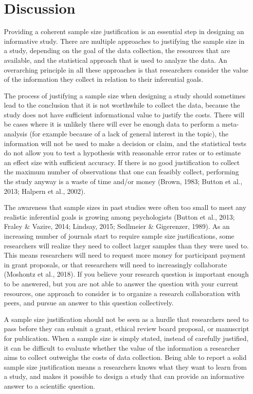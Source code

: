 \documentclass[
  english,
  ,jou, a4paper,floatsintext]{apa6}
\begin{document}
\hypertarget{discussion}{%
\section{Discussion}\label{discussion}}

Providing a coherent sample size justification is an essential step in designing an informative study. There are multiple approaches to justifying the sample size in a study, depending on the goal of the data collection, the resources that are available, and the statistical approach that is used to analyze the data. An overarching principle in all these approaches is that researchers consider the value of the information they collect in relation to their inferential goals.

The process of justifying a sample size when designing a study should sometimes lead to the conclusion that it is not worthwhile to collect the data, because the study does not have sufficient informational value to justify the costs. There will be cases where it is unlikely there will ever be enough data to perform a meta-analysis (for example because of a lack of general interest in the topic), the information will not be used to make a decision or claim, and the statistical tests do not allow you to test a hypothesis with reasonable error rates or to estimate an effect size with sufficient accuracy. If there is no good justification to collect the maximum number of observations that one can feasibly collect, performing the study anyway is a waste of time and/or money (Brown, 1983; Button et al., 2013; Halpern et al., 2002).

The awareness that sample sizes in past studies were often too small to meet any realistic inferential goals is growing among psychologists (Button et al., 2013; Fraley \& Vazire, 2014; Lindsay, 2015; Sedlmeier \& Gigerenzer, 1989). As an increasing number of journals start to require sample size justifications, some researchers will realize they need to collect larger samples than they were used to. This means researchers will need to request more money for participant payment in grant proposals, or that researchers will need to increasingly collaborate (Moshontz et al., 2018). If you believe your research question is important enough to be answered, but you are not able to answer the question with your current resources, one approach to consider is to organize a research collaboration with peers, and pursue an answer to this question collectively.

A sample size justification should not be seen as a hurdle that researchers need to pass before they can submit a grant, ethical review board proposal, or manuscript for publication. When a sample size is simply stated, instead of carefully justified, it can be difficult to evaluate whether the value of the information a researcher aims to collect outweighs the costs of data collection. Being able to report a solid sample size justification means a researchers knows what they want to learn from a study, and makes it possible to design a study that can provide an informative answer to a scientific question.
\end{document}
